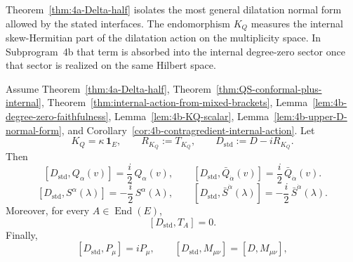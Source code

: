 \begin{remark}
Theorem~\ref{thm:4a-Delta-half} isolates the most general dilatation normal form
allowed by the stated interfaces. The endomorphism \(K_Q\) measures the
internal skew-Hermitian part of the dilatation action on the multiplicity
space. In Subprogram~4b that term is absorbed into the internal degree-zero
sector once that sector is realized on the same Hilbert space.
\end{remark}

\begin{corollary}
\label{cor:4b-dilatation-normalization}
Assume Theorem~\ref{thm:4a-Delta-half},
Theorem~\ref{thm:QS-conformal-plus-internal},
Theorem~\ref{thm:internal-action-from-mixed-brackets},
Lemma~\ref{lem:4b-degree-zero-faithfulness},
Lemma~\ref{lem:4b-KQ-scalar},
Lemma~\ref{lem:4b-upper-D-normal-form}, and
Corollary~\ref{cor:4b-contragredient-internal-action}. Let
\[
K_Q=\kappa\,\mathbf 1_E,
\qquad
R_{K_Q}:=T_{K_Q},
\qquad
D_{\mathrm{std}}:=D-iR_{K_Q}.
\]
Then
\[
[D_{\mathrm{std}},Q_\alpha(v)]
=
\frac{i}{2}\,Q_\alpha(v),
\qquad
[D_{\mathrm{std}},\bar Q_{\dot\alpha}(v)]
=
\frac{i}{2}\,\bar Q_{\dot\alpha}(v).
\]
\[
[D_{\mathrm{std}},S^\alpha(\lambda)]
=
-\frac{i}{2}\,S^\alpha(\lambda),
\qquad
[D_{\mathrm{std}},\bar S^{\dot\alpha}(\lambda)]
=
-\frac{i}{2}\,\bar S^{\dot\alpha}(\lambda).
\]
Moreover, for every \(A\in\operatorname{End}(E)\),
\[
  [D_{\mathrm{std}},T_A]=0.
\]
Finally,
\[
  [D_{\mathrm{std}},P_\mu]=iP_\mu,
  \qquad
  [D_{\mathrm{std}},M_{\mu\nu}]=[D,M_{\mu\nu}],
\]
\end{corollary}

